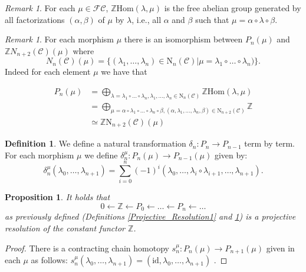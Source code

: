 \documentclass[12pt,reqno]{amsart}
\newtheorem{prop}[teo]{Proposition}
\theoremstyle{definition}
\newtheorem{defi}[teo]{Definition}
\theoremstyle{remark}
\newtheorem{rem}[teo]{Remark}
\numberwithin{figure}{section}%
\newcommand{\CC}{\mathcal{C}}
\newcommand{\F}{\mathcal{F}}
\newcommand{\id}{\mathrm{id}}
\newcommand{\N}{\mathrm{N}}
\begin{document}
\begin{rem}
    For each $\mu\in \F \CC$, $\mathbb{Z} \mathrm{Hom}(\lambda,\mu)$ is the free abelian group generated by all factorizations $(\alpha,\beta)$ of $\mu$ by $\lambda$, i.e., all $\alpha$ and $\beta$ such that $\mu=\alpha \circ \lambda \circ \beta$.
\end{rem}
\begin{rem}
    For each morphism $\mu$ there is an isomorphism between $P_n(\mu)$ and $\mathbb{Z} N_{n+2}(\CC)(\mu)$ where $$N_{n}(\CC)(\mu)=\{(\lambda_1,\dots,\lambda_n) \in \N_n(\CC)| \mu=\lambda_1 \circ \dots \circ \lambda_n)\}.$$ 
    Indeed for each element $\mu$ we have that 
    
    \begin{align*}
        P_n(\mu)&=\bigoplus_{\lambda=\lambda_1\circ \dots \circ \lambda_n,\lambda_1, \dots, \lambda_n \in\N_n(\CC) }\mathbb{Z} \mathrm{Hom}(\lambda,\mu)\\&=\bigoplus_{\mu=\alpha \circ \lambda_1\circ \dots \circ \lambda_n \circ \beta,(\alpha,\lambda_1, \dots, \lambda_n,\beta) \in\N_{n+2}(\CC) }\mathbb{Z}\\&\simeq \mathbb{Z} \N_{n+2}(\CC)(\mu)
    \end{align*}
\end{rem}

\begin{defi}\label{Natural_Transformation}
    We define a natural transformation $\delta_n \colon P_n\rightarrow P_{n-1}$ term by term. For each morphism $\mu$ we define $\delta_n^\mu \colon P_n(\mu)\rightarrow P_{n-1}(\mu)$ given by:
    $$\delta^\mu_n(\lambda_0,\dots,\lambda_{n+1})=\sum_{i=0}^{n} (-1)^i (\lambda_0,\dots,\lambda_i \circ \lambda_{i+1}, \dots, \lambda_{n+1}).
    $$
\end{defi}

\begin{prop} It holds that
$$0 \leftarrow \mathbb{Z} \leftarrow P_0 \leftarrow \dots \leftarrow P_n \leftarrow \dots$$ as previously defined (Definitions \ref{Projective_Resolution1} and \ref{Natural_Transformation}) is a projective resolution of the constant functor $\mathbb{Z}$.
\end{prop}

 \begin{proof}
     There is a contracting chain homotopy $s^\mu_n\colon P_n(\mu) \rightarrow P_{n+1}(\mu)$ given in each $\mu$ as follows:
     $s^\mu_n(\lambda_0,\dots,\lambda_{n+1})=(\id,\lambda_0,\dots,\lambda_{n+1})$
     \cite{BAUES1}.
 \end{proof}
 
\end{document}
